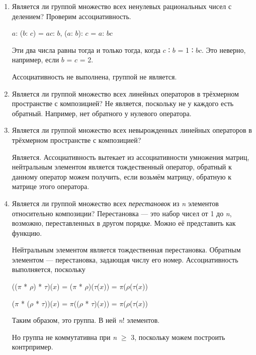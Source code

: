 \documentclass[12pt]{article}
\begin{document}
\begin{enumerate}
        \item
              Является ли группой множество всех ненулевых рациональных чисел с
              делением? Проверим ассоциативность.

              $a$: ($b$: $c$) = $a$$c$: $b$, ($a$: $b$): $c$ = $a$: $b$$c$

                  Эти два числа равны тогда и только тогда, когда $c$ ∶ $b$ = 1 ∶ $b$$c$. Это
                  неверно, например, если $b$ = $c$ = 2.

              Ассоциативность не выполнена, группой не является.

        \item
              Является ли группой множество всех линейных операторов в трёхмерном
              пространстве с композицией? Не является, поскольку не у каждого есть
              обратный. Например, нет обратного у нулевого оператора.
        \item
              Является ли группой множество всех невырожденных линейных операторов в
              трёхмерном пространстве с композицией?

              Является. Ассоциативность вытекает из ассоциативности умножения матриц,
              нейтральным элементом является тождественный оператор, обратный к
              данному оператор можем получить, если возьмём матрицу, обратную к
              матрице этого оператора.

        \item
              Является ли группой множество всех \emph{перестановок} из \emph{n}
              элементов относительно композиции? Перестановка --- это набор чисел от
              1 до \emph{n}, возможно, переставленных в другом порядке. Можно её
              представить как функцию.

              Нейтральным элементом является тождественная перестановка. Обратным
              элементом --- перестановка, задающая числу его номер. Ассоциативность
              выполняется, поскольку

              (($\pi$ * $\rho$) * $\tau$)($x$) = ($\pi$ * $\rho$)($\tau$($x$)) = $\pi$($\rho$($\tau$($x$))

              ($\pi$ * ($\rho$ * $\tau$))($x$) = $\pi$(($\rho$ * $\tau$)($x$)) = $\pi$($\rho$($\tau$($x$))

              Таким образом, это группа. В ней \emph{n}! элементов.

              Но группа не коммутативна при \emph{n} $\geq$ 3, поскольку можем построить
              контрпример.


\end{enumerate}
\end{document}
